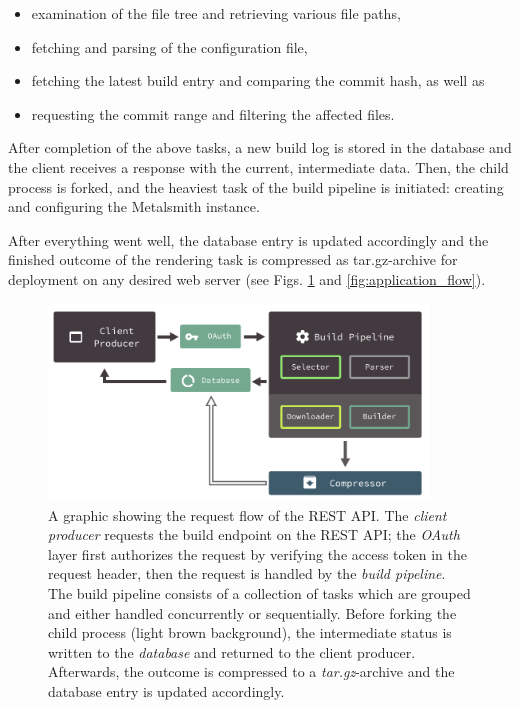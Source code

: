 \documentclass[a4paper,english,11pt]{report}
\begin{document}
\begin{itemize}
  \item examination of the file tree and retrieving various file paths,
  \item fetching and parsing of the configuration file,
  \item fetching the latest build entry and comparing the commit hash, as well as
  \item requesting the commit range and filtering the affected files.
\end{itemize}
After completion of the above tasks, a new build log is stored in the database and the client receives a response with the current, intermediate data. Then, the child process is forked, and the heaviest task of the build pipeline is initiated: creating and configuring the Metalsmith instance.

After everything went well, the database entry is updated accordingly and the finished outcome of the rendering task is compressed as tar.gz-archive for deployment on any desired web server (see Figs. \ref{fig:request_flow} and \ref{fig:application_flow}).

%
\begin{figure}
    \centering
    \includegraphics[width=0.9\textwidth]{request_flow.png}
    \caption{A graphic showing the request flow of the REST API. The \emph{client producer} requests the build endpoint on the REST API; the \emph{OAuth} layer first authorizes the request by verifying the access token in the request header, then the request is handled by the \emph{build pipeline}. The build pipeline consists of a collection of tasks which are grouped and either handled concurrently or sequentially. Before forking the child process (light brown background), the intermediate status is written to the \emph{database} and returned to the client producer. Afterwards, the outcome is compressed to a \emph{tar.gz}-archive and the database entry is updated accordingly.}
    \label{fig:request_flow}
\end{figure}
%
\end{document}
